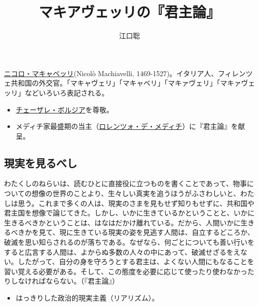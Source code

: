 \documentclass[autodetect-engine,dvipdfmx-if-dvi,ja=standard]{bxjsarticle} \usepackage{mystyle}
\author{江口聡}
\title{マキアヴェッリの『君主論』}
\begin{document}
\maketitle
\else\chapter{}
\fi


\href{http://bit.ly/2W4939e}{ニコロ・マキャベッリ}(Nicol{\`o} Machiavelli, 1469-1527)。イタリア人、フィレンツェ共和国の外交官。「マキャヴェリ」「マキャベリ」「マキァヴェリ」「マキァヴェッリ」などいろいろ表記される。

\begin{itemize}
\item \href{http://bit.ly/2VWy1Y3}{チェーザレ・ボルジア}を尊敬。
\item メディチ家最盛期の当主（\href{http://bit.ly/2HKxOgu}{ロレンツォ・デ・メディチ}）に『君主論』を献呈。
\end{itemize}






\section{現実を見るべし}



\begin{oframed}
わたくしのねらいは、読むひとに直接役に立つものを書くことであって、物事についての想像の世界のことより、生々しい真実を追うほうがふさわしいと、わたしは思う。これまで多くの人は、現実のさまを見もせず知りもせずに、共和国や君主国を想像で論じてきた。しかし、いかに生きているかということと、いかに生きるべきかということは、はなはだかけ離れている。だから、人間いかに生きるべきかを見て、現に生きている現実の姿を見逃す人間は、自立するどころか、破滅を思い知らされるのが落ちである。なぜなら、何ごとについても善い行いをすると広言する人間は、よからぬ多数の人々の中にあって、破滅せざるをえない。したがって、自分の身を守ろうとする君主は、よくない人間にもなることを習い覚える必要がある。そして、この態度を必要に応じて使ったり使わなかったりしなければならない。（『君主論』）
\end{oframed}

\begin{itemize}
\item はっきりした政治的現実主義（リアリズム）。
\end{itemize}
\end{document}
